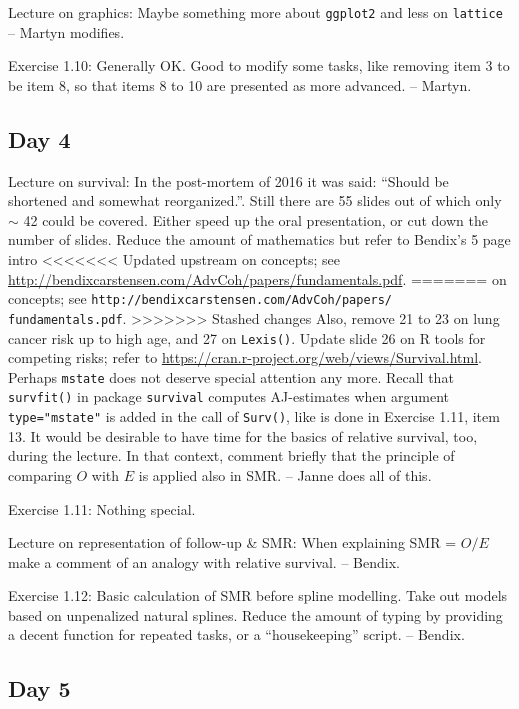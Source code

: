 \documentclass[11pt,a4]{article}
\begin{document}
Lecture on graphics: Maybe something more about {\tt ggplot2} 
and less on {\tt lattice} -- Martyn modifies.

Exercise 1.10: Generally OK. Good to modify some tasks, 
like removing item 3 to be item 8, so that items 8 to 10 are presented as more advanced. -- Martyn.

\subsection*{Day 4}

Lecture on survival: In the post-mortem of 2016 it was said: 
``Should be shortened and somewhat reorganized.''. 
Still there are 55 slides out of which only $\sim$ 42 could be covered. 
Either speed up the oral presentation, or cut down the number of slides.
Reduce the amount of mathematics but refer to Bendix's 5 page intro
<<<<<<< Updated upstream
on concepts; see \url{http://bendixcarstensen.com/AdvCoh/papers/fundamentals.pdf}.
=======
on concepts; see \verb|http://bendixcarstensen.com/AdvCoh/papers/| \verb|fundamentals.pdf|.
>>>>>>> Stashed changes
Also, remove 21 to 23 on lung cancer risk up to high age, and 27 on {\tt Lexis()}.
Update slide 26 on R tools for competing risks; refer
to \url{https://cran.r-project.org/web/views/Survival.html}.
 Perhaps {\tt mstate} does not deserve special attention any more.
Recall that {\tt survfit()} 
in package {\tt survival} computes AJ-estimates when argument {\tt type="mstate"}
is added in the call of {\tt Surv()}, like is done in Exercise 1.11, item 13.
It would be desirable to have time for the basics of relative survival, too,
during the lecture. In that context, comment briefly that the principle of
comparing $O$ with $E$ is applied also in SMR.
-- Janne does all of this.

Exercise 1.11: Nothing special. 

Lecture on representation of follow-up \& SMR: When explaining SMR = $O/E$
 make a comment of an analogy with relative survival. -- Bendix. 

Exercise 1.12: Basic calculation of SMR before spline modelling.
Take out models based on unpenalized natural splines.
 Reduce the amount of typing by providing a decent function
for repeated tasks, or a ``housekeeping'' script. -- Bendix.  

\subsection*{Day 5}
\end{document}
